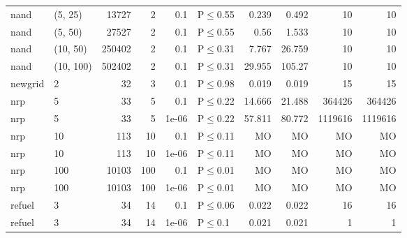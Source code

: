 \begin{longtable}{llrrrlrrrr}
 nand          & (5, 25)   &  	13727 &   2 & 0.1   & P$\leq$0.55  & 0.239  & 0.492  & 10      & 10      \\
 nand          & (5, 50)   &  	27527 &   2 & 0.1   & P$\leq$0.55  & 0.56   & 1.533  & 10      & 10      \\
 nand          & (10, 50)  & 	250402 &   2 & 0.1   & P$\leq$0.31  & 7.767  & 26.759 & 10      & 10      \\
 nand          & (10, 100) & 	502402 &   2 & 0.1   & P$\leq$0.31  & 29.955 & 105.27 & 10      & 10      \\
 newgrid       & 2         &     	32 &   3 & 0.1   & P$\leq$0.98  & 0.019  & 0.019  & 15      & 15      \\
 nrp           & 5         &     	33 &   5 & 0.1   & P$\leq$0.22  & 14.666 & 21.488 & 364426  & 364426  \\
 nrp           & 5         &     	33 &   5 & 1e-06 & P$\leq$0.22  & 57.811 & 80.772 & 1119616 & 1119616 \\
 nrp           & 10        &    	113 &  10 & 0.1   & P$\leq$0.11  & MO     & MO     & MO      & MO      \\
 nrp           & 10        &    	113 &  10 & 1e-06 & P$\leq$0.11  & MO     & MO     & MO      & MO      \\
 nrp           & 100       &  	10103 & 100 & 0.1   & P$\leq$0.01  & MO     & MO     & MO      & MO      \\
 nrp           & 100       &  	10103 & 100 & 1e-06 & P$\leq$0.01  & MO     & MO     & MO      & MO      \\
 refuel        & 3         &     	34 &  14 & 0.1   & P$\leq$0.06  & 0.022  & 0.022  & 16      & 16      \\
 refuel        & 3         &     	34 &  14 & 1e-06 & P$\leq$0.1   & 0.021  & 0.021  & 1       & 1       \\
\bottomrule
\end{longtable}
